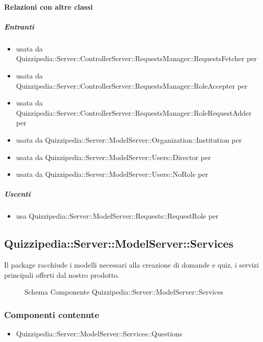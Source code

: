 \paragraph{Relazioni con altre classi}
\subparagraph{Entranti}
\begin{itemize}
\item usata da Quizzipedia::Server::ControllerServer::RequestsManager::RequestsFetcher per 
\item usata da Quizzipedia::Server::ControllerServer::RequestsManager::RoleAccepter per 
\item usata da Quizzipedia::Server::ControllerServer::RequestsManager::RoleRequestAdder per 
\item usata da Quizzipedia::Server::ModelServer::Organization::Institution per 
\item usata da Quizzipedia::Server::ModelServer::Users::Director per 
\item usata da Quizzipedia::Server::ModelServer::Users::NoRole per 
\end{itemize}
\subparagraph{Uscenti}
\begin{itemize}
\item usa Quizzipedia::Server::ModelServer::Requests::RequestRole per 
\end{itemize}
\subsection{Quizzipedia::Server::ModelServer::Services}
Il package racchiude i modelli necessari alla creazione di domande e quiz, i servizi principali offerti dal nostro prodotto.
\begin{figure}[H]
\centering
\noindent{}
\caption[Schema Componente Quizzipedia::Server::ModelServer::Services]{Schema Componente Quizzipedia::Server::ModelServer::Services}
\end{figure}
\subsubsection{Componenti contenute}
\begin{itemize}
\item Quizzipedia::Server::ModelServer::Services::Questions
\end{itemize}
